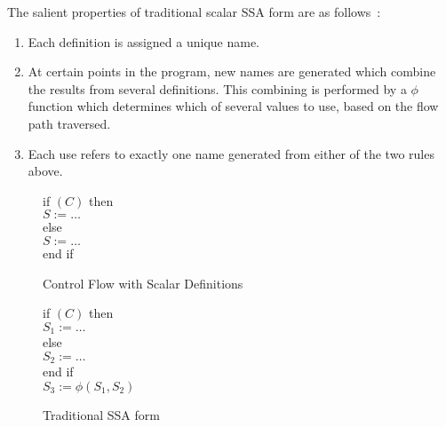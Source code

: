 The salient properties of traditional scalar
SSA form are as follows~\cite{CFRWZ91a}:
\begin{enumerate}

\item Each definition is assigned a unique name.

\item At certain points in the program, new names are generated which
combine the results from several definitions.
This combining is performed by a $\phi$ function which
determines which of several values to use, based on the flow path
traversed.  

\item Each use refers to exactly one name generated from either
of the two rules above.
\end{enumerate}


\begin{figure}%
\begin{center}
\parbox{3.0in}{
\begin{programa}
\Ta  if $(C)$ then  \\
\Tb  $S := \ldots$   \\
\Ta  else     \\
\Tb  $S := \ldots$  \\
\Ta  end if 
\end{programa}
}
\end{center}
\caption{Control Flow with Scalar Definitions}
\label{scalar-source}
\end{figure}


\begin{figure}%
\begin{center}
\parbox{3.0in}{
\begin{programa}
\Ta  if $(C)$ then \\
\Tb   $S_1 := \ldots$ \\
\Ta  else  \\
\Tb   $S_2 := \ldots$ \\
\Ta  end if \\
\Ta  $S_3 := \phi (S_1,S_2)$
\end{programa}
}
\end{center}
\caption{Traditional SSA form}
\label{trad-ssa}
\end{figure}


